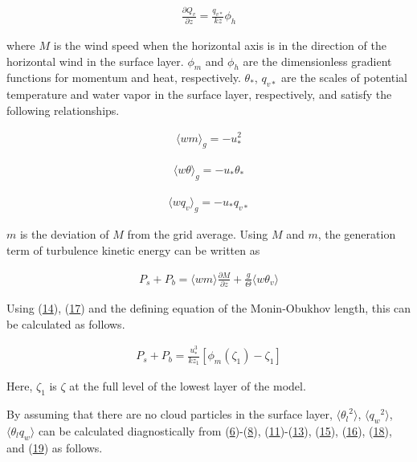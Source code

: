 \begin{eqnarray} \frac{\partial Q_v}{\partial z} = \frac{q_{v*}}{kz}\phi_h \tag{p-dif.16}\end{eqnarray}

where \(M\) is the wind speed when the horizontal axis is in the
direction of the horizontal wind in the surface layer. \(\phi_m\) and
\(\phi_h\) are the dimensionless gradient functions for momentum and
heat, respectively. \(\theta_*\), \(q_{v*}\) are the scales of potential
temperature and water vapor in the surface layer, respectively, and
satisfy the following relationships.

\begin{eqnarray} \langle wm \rangle_g = -u_*^2 \tag{p-dif.17}\end{eqnarray}

\begin{eqnarray} \langle w\theta \rangle_g = -u_*\theta_* \tag{p-dif.18}\end{eqnarray}

\begin{eqnarray} \langle wq_v \rangle_g = -u_*q_{v*} \tag{p-dif.19}\end{eqnarray}

\(m\) is the deviation of \(M\) from the grid average. Using \(M\) and
\(m\), the generation term of turbulence kinetic energy can be written
as

\begin{eqnarray} P_s + P_b = \langle wm \rangle \frac{\partial M}{\partial z} + \frac{g}{\Theta} \langle w\theta_v \rangle \end{eqnarray}

Using (\href{p-dif.14}{14}), (\href{p-dif.17}{17}) and the defining
equation of the Monin-Obukhov length, this can be calculated as follows.

\begin{eqnarray} P_s + P_b = \frac{u_*^3}{kz_1}\left[\phi_m\left(\zeta_1\right)-\zeta_1\right] \end{eqnarray}

Here, \(\zeta_1\) is \(\zeta\) at the full level of the lowest layer of
the model.

By assuming that there are no cloud particles in the surface layer,
\(\langle {\theta_l}^2\rangle\), \(\langle {q_w}^2\rangle\),
\(\langle \theta_lq_w\rangle\) can be calculated diagnostically from
(\href{p-dif.6}{6})-(\href{p-dif.8}{8}),
(\href{p-dif.11}{11})-(\href{p-dif.13}{13}), (\href{p-dif.15}{15}),
(\href{p-dif.16}{16}), (\href{p-dif.18}{18}), and (\href{p-dif.19}{19})
as follows.

